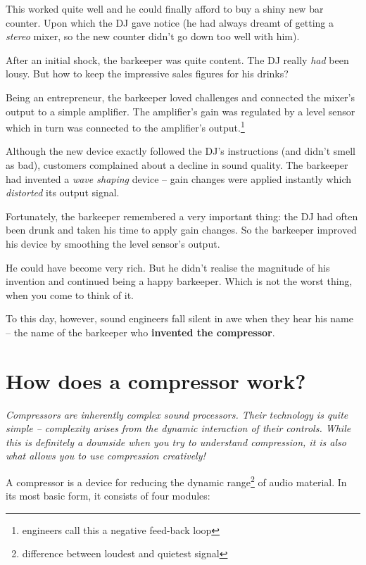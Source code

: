 This worked quite well and he could finally afford to buy a shiny new
bar counter.  Upon which the DJ gave notice (he had always dreamt of
getting a \emph{stereo} mixer, so the new counter didn't go down too
well with him).

After an initial shock, the barkeeper was quite content.  The DJ
really \emph{had} been lousy.  But how to keep the impressive sales
figures for his drinks?

Being an entrepreneur, the barkeeper loved challenges and connected
the mixer's output to a simple amplifier.  The amplifier's gain was
regulated by a level sensor which in turn was connected to the
amplifier's output.\footnote{engineers call this a negative feed-back
  loop}

Although the new device exactly followed the DJ's instructions (and
didn't smell as bad), customers complained about a decline in sound
quality.  The barkeeper had invented a \emph{wave shaping} device --
gain changes were applied instantly which \emph{distorted} its output
signal.

Fortunately, the barkeeper remembered a very important thing: the DJ
had often been drunk and taken his time to apply gain changes.  So the
barkeeper improved his device by smoothing the level sensor's output.

He could have become very rich.  But he didn't realise the magnitude
of his invention and continued being a happy barkeeper.  Which is not
the worst thing, when you come to think of it.

To this day, however, sound engineers fall silent in awe when they
hear his name -- the name of the barkeeper who \textbf{invented the
  compressor}.

\section{How does a compressor work?}
\label{sec:how_does_a_compressor_work}

\emph{Compressors are inherently complex sound processors.  Their
  technology is quite simple -- complexity arises from the dynamic
  interaction of their controls.  While this is definitely a downside
  when you try to understand compression, it is also what allows you
  to use compression creatively!}

A compressor is a device for reducing the dynamic
range\footnote{difference between loudest and quietest signal} of audio
material.  In its most basic form, it consists of four modules:

